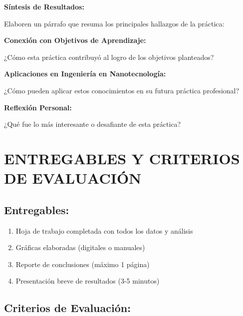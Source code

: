 \documentclass[12pt,a4paper]{article}
\begin{document}
	\begin{conclusionbox}
		\textbf{Síntesis de Resultados:}
		
		Elaboren un párrafo que resuma los principales hallazgos de la práctica:
		
		\vspace{3cm}
		
		\textbf{Conexión con Objetivos de Aprendizaje:}
		
		¿Cómo esta práctica contribuyó al logro de los objetivos planteados?
		
		\vspace{3cm}
		
		\textbf{Aplicaciones en Ingeniería en Nanotecnología:}
		
		¿Cómo pueden aplicar estos conocimientos en su futura práctica profesional?
		
		\vspace{3cm}
		
		\textbf{Reflexión Personal:}
		
		¿Qué fue lo más interesante o desafiante de esta práctica?
		
		\vspace{3cm}
	\end{conclusionbox}
	
	
	\section{ENTREGABLES Y CRITERIOS DE EVALUACIÓN}
	
	\subsection{Entregables:}
	
	\begin{enumerate}
		\item Hoja de trabajo completada con todos los datos y análisis
		\item Gráficas elaboradas (digitales o manuales)
		\item Reporte de conclusiones (máximo 1 página)
		\item Presentación breve de resultados (3-5 minutos)
	\end{enumerate}
	
	\subsection{Criterios de Evaluación:}
	
\end{document}
